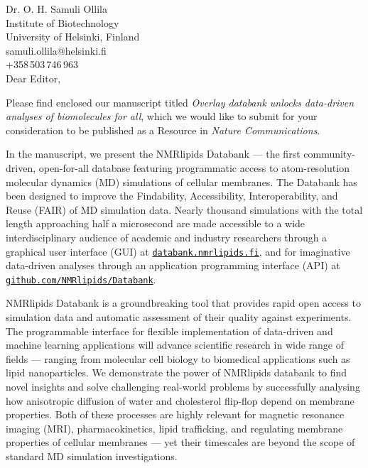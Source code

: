 \documentclass[11pt]{letter}
\begin{document}
\reversemarginpar
\pagestyle{empty}
\noindent Dr. O. H. Samuli Ollila \\
\noindent Institute of Biotechnology \\
\noindent University of Helsinki, Finland \\
\noindent samuli.ollila@helsinki.fi\\
\noindent +358\,503\,746\,963 \\


Dear Editor,

Please find enclosed our manuscript titled
{\it Overlay databank unlocks data-driven analyses of biomolecules for all}, which we would like to submit for your consideration to be published as a Resource in \textit{ Nature Communications}.

In the manuscript, we present the NMRlipids Databank --- the first community-driven, open-for-all database featuring programmatic access to atom-resolution molecular dynamics (MD) simulations of cellular membranes. The Databank has been designed to improve the Findability, Accessibility, Interoperability, and Reuse (FAIR) of MD simulation data. Nearly thousand simulations with the total length approaching half a microsecond are made accessible to a wide interdisciplinary audience of academic and industry researchers through a graphical user interface (GUI) at \href{https://databank.nmrlipids.fi/}{\tt databank.nmrlipids.fi}, and for imaginative data-driven analyses through an application programming interface (API) at \href{https://github.com/NMRlipids/Databank}{\tt github.com/NMRlipids/Databank}.

NMRlipids Databank is a groundbreaking tool that provides rapid open access to simulation data and automatic assessment of their quality against experiments. The programmable interface for flexible implementation of data-driven and machine learning applications will advance scientific research in wide range of fields
--- ranging from molecular cell biology to biomedical applications such as lipid nanoparticles. 
We demonstrate the power of NMRlipids databank to find novel insights and solve challenging real-world problems
by successfully analysing how anisotropic diffusion of water and cholesterol flip-flop depend on membrane properties. Both of these processes are highly relevant for magnetic resonance imaging (MRI), pharmacokinetics, lipid trafficking, and regulating membrane properties of cellular membranes --- yet their timescales are beyond the scope of standard MD simulation investigations. 
\end{document}
